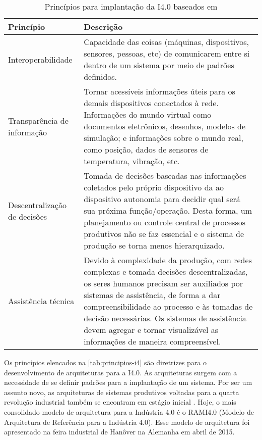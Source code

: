 	\begin{table}[htb]
		\centering
		\footnotesize
		\caption{Princípios para implantação da I4.0 baseados em }
		\label{tab:principios-i4}
		\begin{tabular}{p{3cm}p{12cm}}
			\hline
			\textbf{Princípio} & \textbf{Descrição} \\
			
			\hline
			Interoperabilidade &
			Capacidade das coisas (máquinas, dispositivos, sensores, pessoas, etc) de comunicarem entre si dentro de um sistema por meio de padrões definidos. \\
			
			\hline
			Transparência de informação &
			Tornar acessíveis informações úteis para os demais dispositivos conectados à rede. Informações do mundo virtual como documentos eletrônicos, desenhos, modelos de simulação; e informações sobre o mundo real, como posição, dados de sensores de temperatura, vibração, etc. \\
			
			\hline
			Descentralização de decisões &
			Tomada de decisões baseadas nas informações coletados pelo próprio dispositivo da ao dispositivo autonomia para decidir qual será sua próxima função/operação. Desta forma, um planejamento ou controle central de processos produtivos não se faz essencial e o sistema de produção se torna menos hierarquizado. \\
			
			\hline
			Assistência técnica &
			Devido à complexidade da produção, com redes complexas e tomada decisões descentralizadas, os seres humanos precisam ser auxiliados por sistemas de assistência, de forma a dar compreensibilidade ao processo e às tomadas de decisão necessárias. Os sistemas de assistência devem agregar e tornar visualizável as informações de maneira compreensível. \\
			
			\hline
		\end{tabular}
	\end{table}

	Os princípios elencados na \autoref{tab:principios-i4} são diretrizes para o desenvolvimento de arquiteturas para a I4.0. As arquiteturas surgem com a necessidade de se definir padrões para a implantação de um sistema. Por ser um assunto novo, as arquiteturas de sistemas produtivos voltadas para a quarta revolução industrial também se encontram em estágio inicial \cite{pisching2018arquitetura}. Hoje, o mais consolidado modelo de arquitetura para a Indústria 4.0 é o RAMI4.0 (Modelo de Arquitetura de Referência para a Indústria 4.0). Esse modelo de arquitetura foi apresentado na feira industrial de Hanôver na Alemanha em abril de 2015.
	
